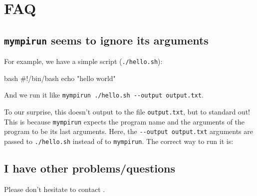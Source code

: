 \section{FAQ}

\subsection{\texttt{mympirun} seems to ignore its arguments}

For example, we have a simple script (\lstinline|./hello.sh|):

\begin{code}{bash}
#!/bin/bash
echo "hello world"
\end{code}

And we run it like \lstinline|mympirun ./hello.sh --output output.txt|.

To our surprise, this doesn't output to the file \lstinline|output.txt|, but to standard out!
This is because \lstinline|mympirun| expects the program name and the arguments of the program to
be its last arguments. Here, the \lstinline|--output output.txt| arguments are passed to
\lstinline|./hello.sh| instead of to \lstinline|mympirun|. The correct way to run it is:

\begin{prompt}
\end{prompt}



\subsection{I have other problems/questions}

Please don't hesitate to contact \hpcinfo.
